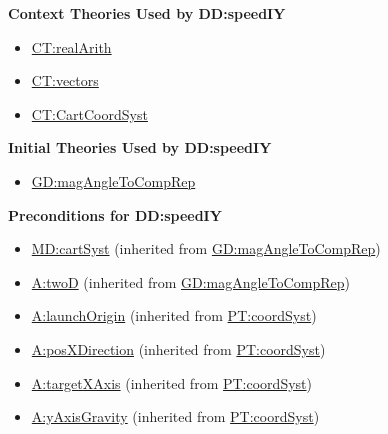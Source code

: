 \documentclass[12pt]{article}
\begin{document}
\noindent \textbf{Context Theories Used by DD:speedIY}

\begin{itemize}
\item \hyperref[CT:realArith]{CT:realArith}
\item \hyperref[CT:vectors]{CT:vectors}
\item \hyperref[CT:CartCoordSyst]{CT:CartCoordSyst}
\end{itemize}

\noindent \textbf{Initial Theories Used by DD:speedIY}

\begin{itemize}
\item \hyperref[GD:magAngleToCompRep]{GD:magAngleToCompRep}
\end{itemize}

\noindent \textbf{Preconditions for DD:speedIY}

\begin{itemize}
\item \hyperref[MD:cartSyst]{MD:cartSyst} (inherited from \hyperref[GD:magAngleToCompRep]{GD:magAngleToCompRep})
\item \hyperref[twoD]{A:twoD} (inherited from \hyperref[GD:magAngleToCompRep]{GD:magAngleToCompRep})
\item \hyperref[launchOrigin]{A:launchOrigin} (inherited from \hyperref[PT:coordSyst]{PT:coordSyst})
\item \hyperref[posXDirection]{A:posXDirection} (inherited from \hyperref[PT:coordSyst]{PT:coordSyst})
\item \hyperref[targetXAxis]{A:targetXAxis} (inherited from \hyperref[PT:coordSyst]{PT:coordSyst})
\item \hyperref[yAxisGravity]{A:yAxisGravity} (inherited from \hyperref[PT:coordSyst]{PT:coordSyst})
\end{itemize}
\end{document}
